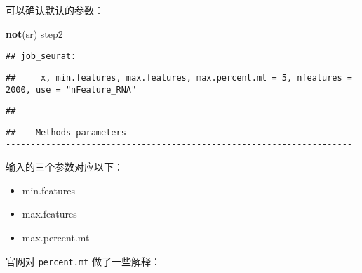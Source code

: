 \documentclass[
]{article}
\newenvironment{Shaded}{\begin{snugshade}}{\end{snugshade}}
\newcommand{\KeywordTok}[1]{\textcolor[rgb]{0.13,0.29,0.53}{\textbf{#1}}}
\newcommand{\NormalTok}[1]{#1}
\providecommand{\tightlist}{%
  \setlength{\itemsep}{0pt}\setlength{\parskip}{0pt}}
\begin{document}
可以确认默认的参数：

\begin{Shaded}
\begin{Highlighting}[]
\KeywordTok{not}\NormalTok{(sr)}
\NormalTok{step2}
\end{Highlighting}
\end{Shaded}

\begin{verbatim}
## job_seurat:
\end{verbatim}

\begin{verbatim}
##     x, min.features, max.features, max.percent.mt = 5, nfeatures = 2000, use = "nFeature_RNA"
\end{verbatim}

\begin{verbatim}
## 
\end{verbatim}

\begin{verbatim}
## -- Methods parameters ------------------------------------------------------------------------------------------------------------------
\end{verbatim}

输入的三个参数对应以下：

\begin{itemize}
\tightlist
\item
  min.features
\item
  max.features
\item
  max.percent.mt
\end{itemize}

官网对 \texttt{percent.mt} 做了一些解释：
\end{document}
